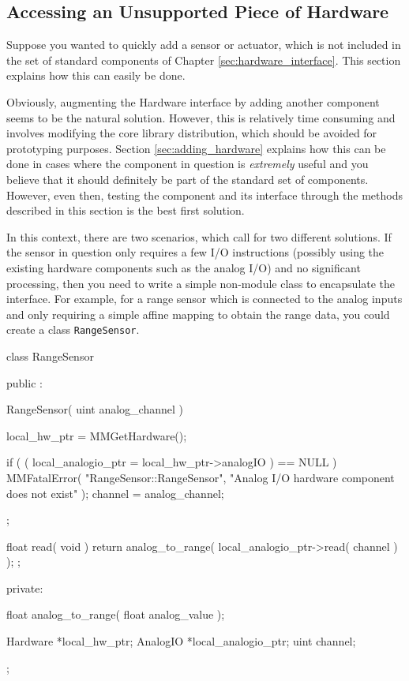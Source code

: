 \subsection{Accessing an Unsupported Piece of Hardware}
\label{sec:unsupported_hardware}

Suppose you wanted to quickly add a sensor or actuator, which is not
included in the set of standard components of Chapter
\ref{sec:hardware_interface}. This section explains how this can easily be
done.

Obviously, augmenting the Hardware interface by adding another component
seems to be the natural solution. However, this is relatively time consuming
and involves modifying the core library distribution, which should be
avoided for prototyping purposes. Section \ref{sec:adding_hardware} explains
how this can be done in cases where the component in question is {\em
extremely} useful and you believe that it should definitely be part of the
standard set of components. However, even then, testing the component and
its interface through the methods described in this section is the best
first solution.

In this context, there are two scenarios, which call for two different
solutions. If the sensor in question only requires a few I/O instructions
(possibly using the existing hardware components such as the analog I/O) and
no significant processing, then you need to write a simple non-module class
to encapsulate the interface. For example, for a range sensor which is
connected to the analog inputs and only requiring a simple affine mapping to
obtain the range data, you could create a class {\tt RangeSensor}.

\begin{classdef}
class RangeSensor {
  public :

    RangeSensor( uint analog_channel ) { 

      local_hw_ptr = MMGetHardware();

      if ( ( local_analogio_ptr = local_hw_ptr->analogIO ) == NULL )
        MMFatalError( "RangeSensor::RangeSensor",
                      "Analog I/O hardware component does not exist" );
      channel = analog_channel; 
    };
  
    float read( void ) { 
      return analog_to_range( local_analogio_ptr->read( channel ) );
    };

  private:

    float analog_to_range( float analog_value );

    Hardware *local_hw_ptr;
    AnalogIO *local_analogio_ptr;
    uint     channel;
};
\end{classdef}

